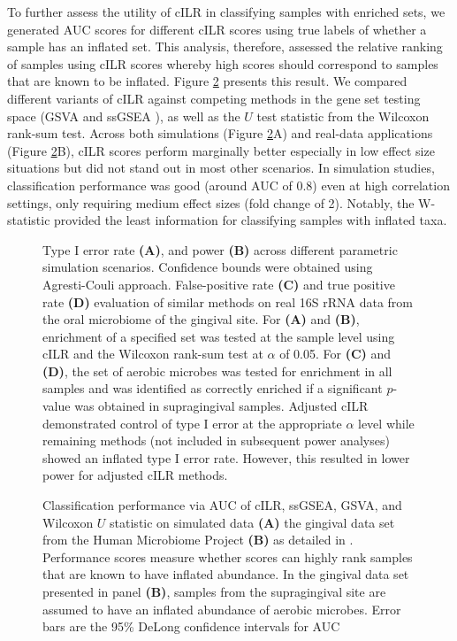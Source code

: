 \documentclass[10pt,letterpaper]{article}
\begin{document}
To further assess the utility of cILR in classifying samples with enriched sets, we generated AUC scores for different cILR scores using true labels of whether a sample has an inflated set. This analysis, therefore, assessed the relative ranking of samples using cILR scores whereby high scores should correspond to samples that are known to be inflated. Figure \ref{fig:ss_auc} presents this result. We compared different variants of cILR against competing methods in the gene set testing space (GSVA \cite{hanzelmann2013} and ssGSEA \cite{barbie2009}), as well as the $U$ test statistic from the Wilcoxon rank-sum test. Across both simulations (Figure \ref{fig:ss_auc}A) and real-data applications (Figure \ref{fig:ss_auc}B), cILR scores perform marginally better especially in low effect size situations but did not stand out in most other scenarios. In simulation studies, classification performance was good (around AUC of 0.8) even at high correlation settings, only requiring medium effect sizes (fold change of 2). Notably, the W-statistic provided the least information for classifying samples with inflated taxa.

\begin{figure}
    \centering
    \caption{Type I error rate \textbf{(A)}, and power \textbf{(B)} across different parametric simulation scenarios. Confidence bounds were obtained using Agresti-Couli \cite{agresti1998} approach. False-positive rate \textbf{(C)} and true positive rate \textbf{(D)} evaluation of similar methods on real 16S rRNA data from the oral microbiome of the gingival site. For \textbf{(A)} and \textbf{(B)}, enrichment of a specified set was tested at the sample level using cILR and the Wilcoxon rank-sum test at $\alpha$ of 0.05. For \textbf{(C)} and \textbf{(D)}, the set of aerobic microbes was tested for enrichment in all samples and was identified as correctly enriched if a significant $p$-value was obtained in supragingival samples. Adjusted cILR demonstrated control of type I error at the appropriate $\alpha$ level while remaining methods (not included in subsequent power analyses) showed an inflated type I error rate. However, this resulted in lower power for adjusted cILR methods.}
    \label{fig:ss_hypo}
\end{figure}

\begin{figure}
    \centering
    \caption{Classification performance via AUC of cILR, ssGSEA, GSVA, and Wilcoxon $U$ statistic on simulated data \textbf{(A)} the gingival data set from the Human Microbiome Project  \textbf{(B)} as detailed in . Performance scores measure whether scores can highly rank samples that are known to have inflated abundance. In the gingival data set presented in panel \textbf{(B)}, samples from the supragingival site are assumed to have an inflated abundance of aerobic microbes. Error bars are the 95\% DeLong confidence intervals for AUC \cite{delong1988}} 
    \label{fig:ss_auc}
\end{figure}
\end{document}
